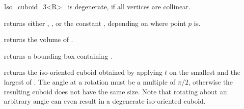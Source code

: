 \begin{ccRefClass} {Iso_cuboid_3<R>}
       {%
        \ccVar\ is degenerate, if all vertices
        are collinear.}

       {returns either ,
        , or the constant
        , 
        depending on where point $p$ is.}

       {}
\ccGlue
{}
       {}
\ccGlue
{}
       {}


       {returns the volume of \ccVar. }

       {returns a bounding box containing \ccVar. }

       {returns the iso-oriented cuboid obtained by applying $t$ on 
        the smallest and the largest of \ccVar.
        \ccPrecond The angle at a rotation must be a multiple of $\pi/2$,
        otherwise the resulting cuboid does not have the same size.
        Note that rotating about an arbitrary angle can even result in
        a degenerate iso-oriented cuboid.}





\end{ccRefClass} 
